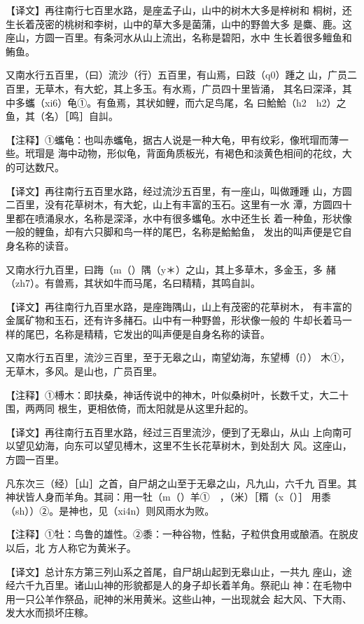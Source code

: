 \documentclass[a4paper,12pt,UTF8,twoside]{ctexbook}
\begin{document}
【译文】再往南行七百里水路，是座孟子山，山中的树木大多是梓树和 桐树，还生长着茂密的桃树和李树，山中的草大多是菌蒲，山中的野兽大多 是麋、鹿。这座山，方圆一百里。有条河水从山上流出，名称是碧阳，水中 生长着很多鳣鱼和鲔鱼。

又南水行五百里，（曰）流沙（行）五百里，有山焉，曰跂（q0）踵之 山，广员二百里，无草木，有大蛇，其上多玉。有水焉，广员四十里皆涌， 其名曰深泽，其中多蠵（xi6）龟①。有鱼焉，其状如鲤，而六足鸟尾，名 曰鮯鮯（h2　h2）之鱼，其（名）［鸣］自訆。

【注释】①蠵龟：也叫赤蠵龟，据古人说是一种大龟，甲有纹彩，像玳瑁而薄一些。玳瑁是 海中动物，形似龟，背面角质板光，有褐色和淡黄色相间的花纹，大的可达数尺。

【译文】再往南行五百里水路，经过流沙五百里，有一座山，叫做踵踵 山，方圆二百里，没有花草树木，有大蛇，山上有丰富的玉石。这里有一水 潭，方圆四十里都在喷涌泉水，名称是深泽，水中有很多蠵龟。水中还生长 着一种鱼，形状像一般的鲤鱼，却有六只脚和鸟一样的尾巴，名称是鮯鮯鱼， 发出的叫声便是它自身名称的读音。

又南水行九百里，曰踇（m（）隅（y＊）之山，其上多草木，多金玉，多 赭（zh7）。有兽焉，其状如牛而马尾，名曰精精，其鸣自訆。

【译文】再往南行九百里水路，是座踇隅山，山上有茂密的花草树木， 有丰富的金属矿物和玉石，还有许多赭石。山中有一种野兽，形状像一般的 牛却长着马一样的尾巴，名称是精精，它发出的叫声便是自身名称的读音。

又南水行五百里，流沙三百里，至于无皋之山，南望幼海，东望榑（f）） 木①，无草木，多风。是山也，广员百里。

【注释】①榑木：即扶桑，神话传说中的神木，叶似桑树叶，长数千丈，大二十围，两两同 根生，更相依倚，而太阳就是从这里升起的。

【译文】再往南行五百里水路，经过三百里流沙，便到了无皋山，从山 上向南可以望见幼海，向东可以望见榑木，这里不生长花草树木，到处刮大 风。这座山，方圆一百里。

凡东次三（经）［山］之首，自尸胡之山至于无皋之山，凡九山，六千九 百里。其神状皆人身而羊角。其祠：用一牡（m（）羊①　，（米）［糈（x（）］ 用黍（sh））②。是神也，见（xi4n）则风雨水为败。

【注释】①牡：鸟鲁的雄性。②黍：一种谷物，性黏，子粒供食用或酿酒。在脱皮以后，北 方人称它为黄米子。

【译文】总计东方第三列山系之首尾，自尸胡山起到无皋山止，一共九 座山，途经六千九百里。诸山山神的形貌都是人的身子却长着羊角。祭祀山 神：在毛物中用一只公羊作祭品，祀神的米用黄米。这些山神，一出现就会 起大风、下大雨、发大水而损坏庄稼。
\end{document}
